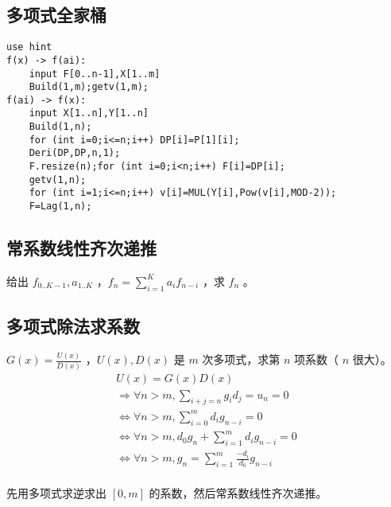 \subsection{多项式全家桶}



\begin{lstlisting}
use hint
f(x) -> f(ai):
	input F[0..n-1],X[1..m]
	Build(1,m);getv(1,m);
f(ai) -> f(x):
	input X[1..n],Y[1..n]
	Build(1,n);
	for (int i=0;i<=n;i++) DP[i]=P[1][i];
	Deri(DP,DP,n,1);
	F.resize(n);for (int i=0;i<n;i++) F[i]=DP[i];
	getv(1,n);
	for (int i=1;i<=n;i++) v[i]=MUL(Y[i],Pow(v[i],MOD-2));
	F=Lag(1,n);
\end{lstlisting}


\subsection{常系数线性齐次递推}

给出 $f_{0..K-1},a_{1..K}$ ，$f_n=\sum_{i=1}^{K}a_if_{n-i}$ ，求 $f_n$ 。



\vspace{-0.5cm}

\subsection{多项式除法求系数}

$G(x)=\frac{U(x)}{D(x)}$ ，$U(x),D(x)$ 是 $m$ 次多项式，求第 $n$ 项系数（ $n$ 很大）。
\vspace{-0.3cm}
$$
\begin{array}{l}
U(x)=G(x)D(x)\\
\Rightarrow\forall n>m,\sum_{i+j=n}g_id_j=u_n=0\\
\Leftrightarrow\forall n>m,\sum_{i=0}^{m}d_ig_{n-i}=0\\
\Leftrightarrow\forall n>m,d_0g_n+\sum_{i=1}^{m}d_ig_{n-i}=0\\
\Leftrightarrow\forall n>m,g_n=\sum_{i=1}^{m}\frac{-d_i}{d_0}g_{n-i}\\
\end{array}
$$

\vspace{-0.3cm}

先用多项式求逆求出 $[0,m]$ 的系数，然后常系数线性齐次递推。



\vspace{-0.5cm}

